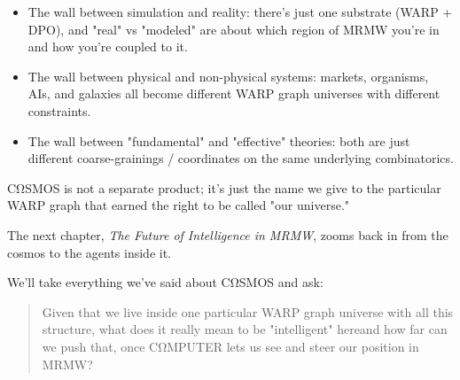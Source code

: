 \begin{itemize}
  \item The wall between simulation and reality: there’s just one substrate (WARP + DPO), and "real" vs "modeled" are about which region of MRMW you’re in and how you’re coupled to it.

  \item The wall between physical and non-physical systems: markets, organisms, AIs, and galaxies all become different WARP graph universes with different constraints.

  \item The wall between "fundamental" and "effective" theories: both are just different coarse-grainings / coordinates on the same underlying combinatorics.
\end{itemize}

CΩSMOS is not a separate product; it’s just the name we give to the particular WARP graph that earned the right to be called "our universe."

\medskip

The next chapter, \emph{The Future of Intelligence in MRMW}, zooms back in from the cosmos to the agents inside it.

We’ll take everything we’ve said about CΩSMOS and ask:

\begin{quote}
Given that we live inside one particular WARP graph universe with all this structure, what does it really mean to be "intelligent" here\emd{}and how far can we push that, once CΩMPUTER lets us see and steer our position in MRMW?  
\end{quote}
